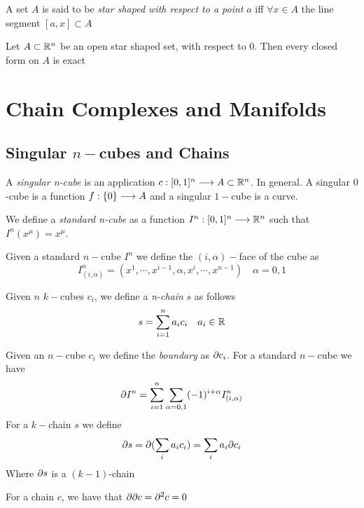 \documentclass[../complete.tex]{subfiles}
\begin{document}
\begin{dfn}
	A set $A$ is said to be \textit{star shaped with respect to a point} $a$ iff $\forall x\in A$ the line segment $[a,x]\subset A$
\end{dfn}
\begin{lem}[Poincaré's]
	Let $A\subset\mathbb{R}^n$ be an open star shaped set, with respect to 0. Then every closed form on $A$ is exact
\end{lem}
\section{Chain Complexes and Manifolds}
\subsection{Singular $n-$cubes and Chains}
\begin{dfn}
	A \textit{singular n-cube} is an application $c:[0,1]^n\overset{}{\longrightarrow} A\subset\mathbb{R}^n$. In general. A singular $0$-cube is a function $f:\{0\}\overset{}{\longrightarrow} A$ and a singular $1-$cube is a curve.
\end{dfn}
\begin{dfn}
	We define a \textit{standard n-cube} as a function $I^n:[0,1]^n\overset{}{\longrightarrow}\mathbb{R}^n$ such that $I^n(x^\mu)=x^\mu$.
\end{dfn}
\begin{dfn}[Face]
	Given a standard $n-$cube $I^n$ we define the $(i,\alpha)-$face of the cube as
	\begin{equation}
		I_{(i,\alpha)}^n=(x^1,\cdots,x^{i-1},\alpha,x^i,\cdots,x^{n-1})\quad\alpha=0,1
		\label{eq:iaface}
	\end{equation}
\end{dfn}
\begin{dfn}[Chain]
	Given $n$ $k-$cubes $c_i$, we define a \textit{n-chain} $s$ as follows
	\begin{equation}
		s=\sum_{i=1}^na_ic_i\quad a_i\in\mathbb{R}
		\label{eq:chain}
	\end{equation}
\end{dfn}
\begin{dfn}[Boundary]
	Given an $n-$cube $c_i$ we define the \textit{boundary} as $\partial c_i$. For a standard $n-$cube we have
	\begin{equation}
		\partial I^n=\sum_{i=1}^n\sum_{\alpha=0,1}(-1)^{i+\alpha}I^n_{(i,\alpha)}
		\label{eq:boundarysncube}
	\end{equation}
	For a $k-$chain $s$ we define
	\begin{equation}
		\partial s=\partial(\sum_ia_ic_i)=\sum_ia_i\partial c_i
		\label{eq:chainboundary}
	\end{equation}
	Where $\partial s$ is a $(k-1)$-chain
\end{dfn}
\begin{thm}
	For a chain $c$, we have that $\partial\partial c=\partial^2c=0$
\end{thm}
\end{document}
